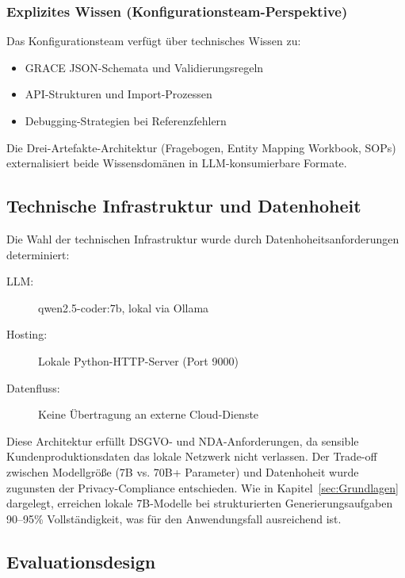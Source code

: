 \subsubsection{Explizites Wissen (Konfigurationsteam-Perspektive)}
\label{subsubsec:ExplizitesWissen}

Das Konfigurationsteam verfügt über technisches Wissen zu:

\begin{itemize}
    \item GRACE JSON-Schemata und Validierungsregeln
    \item API-Strukturen und Import-Prozessen
    \item Debugging-Strategien bei Referenzfehlern
\end{itemize}

Die Drei-Artefakte-Architektur (Fragebogen, Entity Mapping Workbook, SOPs) externalisiert beide Wissensdomänen in LLM-konsumierbare Formate.


\subsection{Technische Infrastruktur und Datenhoheit}
\label{subsec:TechnischeInfrastruktur}

Die Wahl der technischen Infrastruktur wurde durch Datenhoheitsanforderungen determiniert:

\begin{description}
    \item[LLM:] qwen2.5-coder:7b, lokal via Ollama
    \item[Hosting:] Lokale Python-HTTP-Server (Port 9000)
    \item[Datenfluss:] Keine Übertragung an externe Cloud-Dienste
\end{description}

Diese Architektur erfüllt DSGVO- und NDA-Anforderungen, da sensible Kundenproduktionsdaten das lokale Netzwerk nicht verlassen. Der Trade-off zwischen Modellgröße (7B vs. 70B+ Parameter) und Datenhoheit wurde zugunsten der Privacy-Compliance entschieden. Wie in Kapitel~\ref{sec:Grundlagen} dargelegt, erreichen lokale 7B-Modelle bei strukturierten Generierungsaufgaben 90--95\% Vollständigkeit, was für den Anwendungsfall ausreichend ist.


\subsection{Evaluationsdesign}
\label{subsec:Evaluationsdesign}

